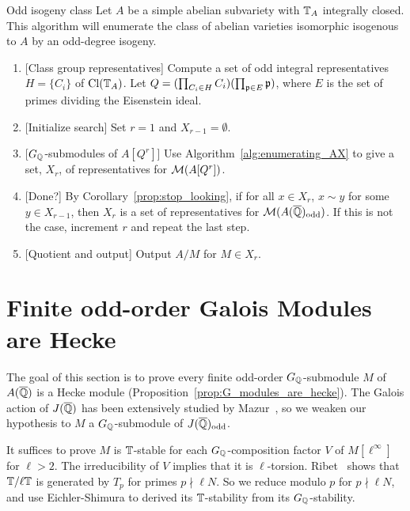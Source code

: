 \documentclass[thesis.tex]{subfiles}
\begin{document}
\begin{algorithm}{Odd isogeny class}%
    \label{alg:odd_isogeny_class}
    Let $A$ be a simple abelian subvariety with $\mathbb{T}_A$ integrally closed. This
    algorithm will enumerate the class of abelian varieties isomorphic
    isogenous to $A$ by an odd-degree isogeny.
    \begin{enumerate}
        \item{} [Class group representatives]
            Compute a set of odd integral representatives $H=\{C_i\}$ of
            $\operatorname{Cl}(\mathbb{T}_A)$. Let $Q = (\prod_{C_i\in H} C_i)(\prod_{\mathfrak{p}\in E} \mathfrak{p})$,
            where $E$ is the set of primes dividing the Eisenstein ideal.
        \item{} [Initialize search]
            Set $r=1$ and $X_{r-1}=\emptyset$.
        \item{} [$G_{\mathbb{Q}}$-submodules of $A[Q^r]$]
            Use Algorithm~\ref{alg:enumerating_AX} to give a set, $X_r$, of
            representatives for $\mathcal{M}(A[Q^r])$.
        \item{} [Done?]
            By Corollary~\ref{prop:stop_looking}, if for all $x\in X_r$, $x\sim
            y$ for some $y\in X_{r-1}$, then $X_r$ is a set of representatives
            for $\mathcal{M}(A(\overline{\mathbb{Q}})_{\mathrm{odd}})$. If this is not the case, increment $r$
            and repeat the last step.
        \item{} [Quotient and output]
            Output $A/M$ for $M\in X_r$.
    \end{enumerate}
\end{algorithm}

\section{Finite odd-order Galois Modules are Hecke}%
\label{sec:finite_odd_order_galois_modules_are_hecke}

The goal of this section is to prove every finite odd-order $G_{\mathbb{Q}}$-submodule $M$
of $A(\overline{\mathbb{Q}})$ is a Hecke module (Proposition~\ref{prop:G_modules_are_hecke}). The
Galois action of $J(\overline{\mathbb{Q}})$ has been extensively studied by
Mazur~\cite{mazur:eisenstein}, so we weaken our hypothesis to $M$ a
$G_{\mathbb{Q}}$-submodule of $J(\overline{\mathbb{Q}})_{\mathrm{odd}}$.

It suffices to prove $M$ is $\mathbb{T}$-stable for each $G_{\mathbb{Q}}$-composition factor $V$
of $M[\ell^\infty]$ for $\ell>2$. The irreducibility of $V$ implies that it is
$\ell$-torsion. Ribet~\cite[Proposition 6.1]{ribet:semistable_gal} shows that
$\mathbb{T}/\ell \mathbb{T}$ is generated by $T_p$ for primes $p\nmid \ell N$. So we reduce
modulo $p$ for $p\nmid \ell N$, and use Eichler-Shimura to derived its
$\mathbb{T}$-stability from its $G_{\mathbb{Q}}$-stability.
\end{document}
